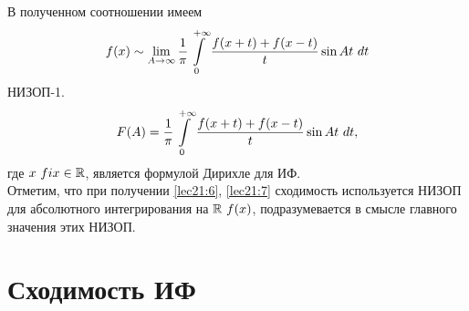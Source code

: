 \documentclass[../../main.tex]{subfiles}
\begin{document}
В полученном соотношении имеем
\begin{equation}
\label{lec21:6}
f(x) \sim \lim\limits_{A \to \infty}
\dfrac{1}{\pi} \int\limits_{0}^{+\infty} \dfrac{f(x + t) + f(x - t)}{t} \sin 
At\ dt
\end{equation} НИЗОП-1.
\begin{equation}
\label{lec21:7}
F(A) = \dfrac{1}{\pi} \int\limits_{0}^{+\infty} 
\dfrac{f(x + t) + f(x - t)}{t} \sin At\ dt,
\end{equation}
где $ x\ fix\in \mathbb{R} $, является формулой Дирихле для ИФ.\\
Отметим, что при получении \eqref{lec21:6}, \eqref{lec21:7}
сходимость используется НИЗОП 
для абсолютного интегрирования на $ \R\ f(x) $, подразумевается в смысле
главного значения этих НИЗОП. %

\section{Сходимость ИФ}
\end{document}
